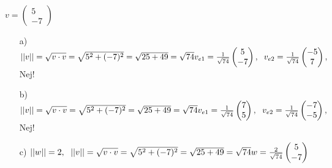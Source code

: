 \subsection{}
\begin{math}
	v
	=\begin{pmatrix}
		5\\
		-7
	\end{pmatrix}
\end{math}
\begin{enumerate}
	\item[a)]
		\begin{math}
			||v||
			=\sqrt{v\cdot v}
			=\sqrt{5^2+(-7)^2}
			=\sqrt{25+49}
			=\sqrt{74}
			\\
			v_{e1}
			=\frac{1}{\sqrt{74}}\begin{pmatrix}
				5\\
				-7
			\end{pmatrix},
            \hspace{6px}
			v_{e2}
			=\frac{1}{\sqrt{74}}\begin{pmatrix}
				-5\\
				7
			\end{pmatrix},
		\end{math}
		\hspace{6px}
		Nej!
	\item[b)]
		\begin{math}
            ||v||
			=\sqrt{v\cdot v}
			=\sqrt{5^2+(-7)^2}
			=\sqrt{25+49}
			=\sqrt{74}
			\\
			v_{e1}
			=\frac{1}{\sqrt{74}}\begin{pmatrix}
				7\\
				5
			\end{pmatrix},
            \hspace{6px}
			v_{e2}
			=\frac{1}{\sqrt{74}}\begin{pmatrix}
				-7\\
				-5
			\end{pmatrix},
		\end{math}
		\hspace{6px}
		Nej!
	\item[c)]
		\begin{math}
            ||w||=2,
            \hspace{6px}
            ||v||
			=\sqrt{v\cdot v}
			=\sqrt{5^2+(-7)^2}
			=\sqrt{25+49}
			=\sqrt{74}
			\\
			w
			=\frac{2}{\sqrt{74}}\begin{pmatrix}
				5\\
				-7
			\end{pmatrix}
		\end{math}
\end{enumerate}
